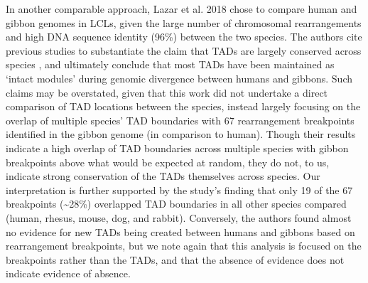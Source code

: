 In another comparable approach, Lazar et al. 2018 \cite{Lazar.2018} chose to compare human and gibbon genomes in LCLs, given the large number of chromosomal rearrangements and high DNA sequence identity (96\%) between the two species. The authors cite previous studies to substantiate the claim that TADs are largely conserved across species \cite{Dixon.2012, Rudan.2015}, and ultimately conclude that most TADs have been maintained as `intact modules' during genomic divergence between humans and gibbons. Such claims may be overstated, given that this work did not undertake a direct comparison of TAD locations between the species, instead largely focusing on the overlap of multiple species' TAD boundaries with 67 rearrangement breakpoints identified in the gibbon genome (in comparison to human). Though their results indicate a high overlap of TAD boundaries across multiple species with gibbon breakpoints above what would be expected at random, they do not, to us, indicate strong conservation of the TADs themselves across species. Our interpretation is further supported by the study's finding that only 19 of the 67 breakpoints (\textasciitilde{}28\%) overlapped TAD boundaries in all other species compared (human, rhesus, mouse, dog, and rabbit). Conversely, the authors found almost no evidence for new TADs being created between humans and gibbons based on rearrangement breakpoints, but we note again that this analysis is focused on the breakpoints rather than the TADs, and that the absence of evidence does not indicate evidence of absence.

